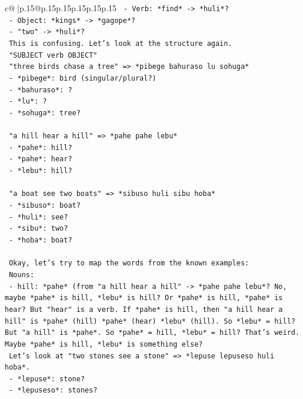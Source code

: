 \documentclass{article}
\begin{document}
{\begin{supertabular}{c@{$\;$}|p{.15\linewidth}@{}p{.15\linewidth}p{.15\linewidth}p{.15\linewidth}p{.15\linewidth}p{.15\linewidth}}
{{{\texttt{   {-} Verb: *find* {-}> *huli*?} \\
\texttt{   {-} Object: *kings* {-}> *gagope*?} \\
\texttt{   {-} "two" {-}> *huli*?} \\
\texttt{   This is confusing. Let's look at the structure again.} \\
\texttt{   "SUBJECT verb OBJECT"} \\
\texttt{   "three birds chase a tree" => *pibege bahuraso lu sohuga*} \\
\texttt{   {-} *pibege*: bird (singular/plural?)} \\
\texttt{   {-} *bahuraso*: ?} \\
\texttt{   {-} *lu*: ?} \\
\texttt{   {-} *sohuga*: tree?} \\
\\ 
\texttt{   "a hill hear a hill" => *pahe pahe lebu*} \\
\texttt{   {-} *pahe*: hill?} \\
\texttt{   {-} *pahe*: hear?} \\
\texttt{   {-} *lebu*: hill?} \\
\\ 
\texttt{   "a boat see two boats" => *sibuso huli sibu hoba*} \\
\texttt{   {-} *sibuso*: boat?} \\
\texttt{   {-} *huli*: see?} \\
\texttt{   {-} *sibu*: two?} \\
\texttt{   {-} *hoba*: boat?} \\
\\ 
\texttt{   Okay, let's try to map the words from the known examples:} \\
\texttt{   Nouns:} \\
\texttt{   {-} hill: *pahe* (from "a hill hear a hill" {-}> *pahe pahe lebu*? No, maybe *pahe* is hill, *lebu* is hill? Or *pahe* is hill, *pahe* is hear? But "hear" is a verb. If *pahe* is hill, then "a hill hear a hill" is *pahe* (hill) *pahe* (hear) *lebu* (hill). So *lebu* = hill? But "a hill" is *pahe*. So *pahe* = hill, *lebu* = hill? That's weird. Maybe *pahe* is hill, *lebu* is something else?} \\
\texttt{   Let's look at "two stones see a stone" => *lepuse lepuseso huli hoba*.} \\
\texttt{   {-} *lepuse*: stone?} \\
\texttt{   {-} *lepuseso*: stones?} \\
}}}
\end{supertabular}}
\end{document}
